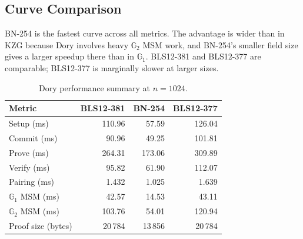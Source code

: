 \subsection{Curve Comparison}

BN-254 is the fastest curve across all metrics. The advantage is wider than in
KZG because Dory involves heavy $\mathbb{G}_2$ MSM work, and BN-254's smaller
field size gives a larger speedup there than in $\mathbb{G}_1$. BLS12-381 and
BLS12-377 are comparable; BLS12-377 is marginally slower at larger sizes.

\begin{table}[H]
\centering
\caption{Dory performance summary at $n = 1024$.}
\label{tab:dory-summary}
\begin{tabular}{lrrr}
\toprule
\textbf{Metric} & \textbf{BLS12-381} & \textbf{BN-254} & \textbf{BLS12-377} \\
\midrule
Setup (ms)                          & 110.96 & 57.59  & 126.04  \\
Commit (ms)                         & 90.96  & 49.25  & 101.81  \\
Prove (ms)                          & 264.31 & 173.06 & 309.89  \\
Verify (ms)                         & 95.82  & 61.90  & 112.07  \\
Pairing (ms)                        & 1.432  & 1.025  & 1.639   \\
$\mathbb{G}_1$ MSM (ms)            & 42.57  & 14.53  & 43.11   \\
$\mathbb{G}_2$ MSM (ms)            & 103.76 & 54.01  & 120.94  \\
Proof size (bytes)                  & 20\,784 & 13\,856 & 20\,784 \\
\bottomrule
\end{tabular}
\end{table}
